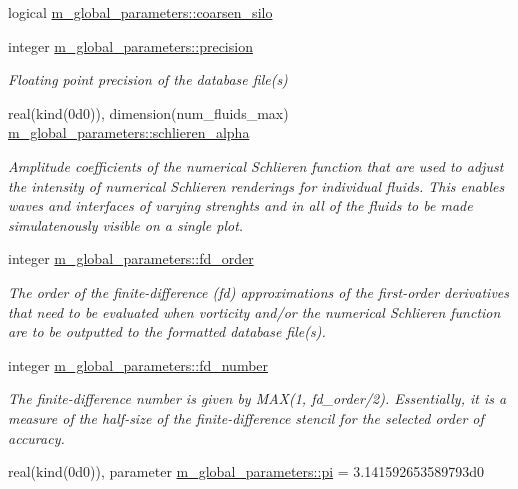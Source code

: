 \begin{DoxyCompactItemize}
logical \hyperlink{namespacem__global__parameters_a2db51a0beed308d7a3c51c5c0ed45609}{m\+\_\+global\+\_\+parameters\+::coarsen\+\_\+silo}
\item 
integer \hyperlink{namespacem__global__parameters_a6ed5e5561c16f30a4010f6612877029d}{m\+\_\+global\+\_\+parameters\+::precision}
\begin{DoxyCompactList}\small\item\em Floating point precision of the database file(s) \end{DoxyCompactList}\item 
real(kind(0d0)), dimension(num\+\_\+fluids\+\_\+max) \hyperlink{namespacem__global__parameters_ada8a4a23b5804dfa9843b25ddd1cd8c1}{m\+\_\+global\+\_\+parameters\+::schlieren\+\_\+alpha}
\begin{DoxyCompactList}\small\item\em Amplitude coefficients of the numerical Schlieren function that are used to adjust the intensity of numerical Schlieren renderings for individual fluids. This enables waves and interfaces of varying strenghts and in all of the fluids to be made simulatenously visible on a single plot. \end{DoxyCompactList}\item 
integer \hyperlink{namespacem__global__parameters_a8892cc67c7d04be4d8e6d02a86e209bc}{m\+\_\+global\+\_\+parameters\+::fd\+\_\+order}
\begin{DoxyCompactList}\small\item\em The order of the finite-\/difference (fd) approximations of the first-\/order derivatives that need to be evaluated when vorticity and/or the numerical Schlieren function are to be outputted to the formatted database file(s). \end{DoxyCompactList}\item 
integer \hyperlink{namespacem__global__parameters_a60d7ab72fdab2b005144a5a45aa572de}{m\+\_\+global\+\_\+parameters\+::fd\+\_\+number}
\begin{DoxyCompactList}\small\item\em The finite-\/difference number is given by M\+AX(1, fd\+\_\+order/2). Essentially, it is a measure of the half-\/size of the finite-\/difference stencil for the selected order of accuracy. \end{DoxyCompactList}\item 
real(kind(0d0)), parameter \hyperlink{namespacem__global__parameters_a21765a90c01d221524670d1344b126cd}{m\+\_\+global\+\_\+parameters\+::pi} = 3.\+141592653589793d0
\end{DoxyCompactItemize}
